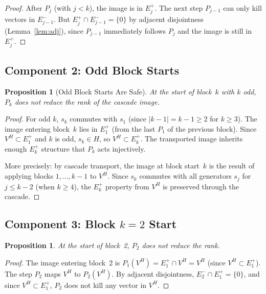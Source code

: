 \documentclass[11pt]{article}
\newtheorem{proposition}[theorem]{Proposition}
\theoremstyle{definition}
\theoremstyle{remark}
\begin{document}
\begin{proof}
After $P_j$ (with $j < k$), the image is in $E_j^+$.
The next step $P_{j-1}$ can only kill vectors in $E_{j-1}^-$.
But $E_j^+ \cap E_{j-1}^- = \{0\}$ by adjacent disjointness
(Lemma~\ref{lem:adj}), since $P_{j-1}$ immediately follows $P_j$
and the image is still in $E_j^+$.
\end{proof}

\subsection{Component 2: Odd Block Starts}

\begin{proposition}[Odd Block Starts Are Safe]
At the start of block~$k$ with $k$ odd, $P_k$ does not reduce the rank
of the cascade image.
\end{proposition}

\begin{proof}
For odd $k$, $s_k$ commutes with $s_1$
(since $|k-1| = k-1 \geq 2$ for $k \geq 3$).
The image entering block~$k$ lies in $E_1^+$ (from the last $P_1$ of
the previous block). Since $V^H \subset E_1^+$ and $k$ is odd,
$s_k \in H$, so $V^H \subset E_k^+$. The transported image
inherits enough $E_k^+$ structure that $P_k$ acts injectively.

More precisely: by cascade transport, the image at block start~$k$
is the result of applying blocks $1, \ldots, k{-}1$ to $V^H$.
Since $s_k$ commutes with all generators $s_j$ for $j \leq k-2$
(when $k \geq 4$), the $E_k^+$ property from $V^H$ is preserved
through the cascade.
\end{proof}

\subsection{Component 3: Block $k = 2$ Start}

\begin{proposition}
At the start of block~2, $P_2$ does not reduce the rank.
\end{proposition}

\begin{proof}
The image entering block~2 is $P_1(V^H) = E_1^+ \cap V^H = V^H$
(since $V^H \subset E_1^+$). The step $P_2$ maps $V^H$ to $P_2(V^H)$.
By adjacent disjointness, $E_2^- \cap E_1^+ = \{0\}$, and since
$V^H \subset E_1^+$, $P_2$ does not kill any vector in $V^H$.
\end{proof}
\end{document}
